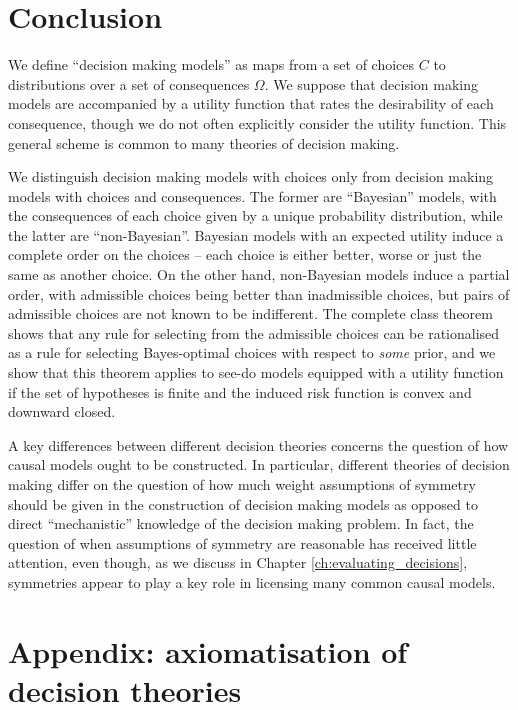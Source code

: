 \section{Conclusion}

We define ``decision making models'' as maps from a set of choices $C$ to distributions over a set of consequences $\Omega$. We suppose that decision making models are accompanied by a utility function that rates the desirability of each consequence, though we do not often explicitly consider the utility function. This general scheme is common to many theories of decision making.

We distinguish decision making models with choices only from decision making models with choices and consequences. The former are ``Bayesian'' models, with the consequences of each choice given by a unique probability distribution, while the latter are ``non-Bayesian''. Bayesian models with an expected utility induce a complete order on the choices -- each choice is either better, worse or just the same as another choice. On the other hand, non-Bayesian models induce a partial order, with admissible choices being better than inadmissible choices, but pairs of admissible choices are not known to be indifferent. The complete class theorem shows that any rule for selecting from the admissible choices can be rationalised as a rule for selecting Bayes-optimal choices with respect to \emph{some} prior, and we show that this theorem applies to see-do models equipped with a utility function if the set of hypotheses is finite and the induced risk function is convex and downward closed.

A key differences between different decision theories concerns the question of how causal models ought to be constructed. In particular, different theories of decision making differ on the question of how much weight assumptions of symmetry should be given in the construction of decision making models as opposed to direct ``mechanistic'' knowledge of the decision making problem. In fact, the question of when assumptions of symmetry are reasonable has received little attention, even though, as we discuss in Chapter \ref{ch:evaluating_decisions}, symmetries appear to play a key role in licensing many common causal models.



\section{Appendix: axiomatisation of decision theories}


